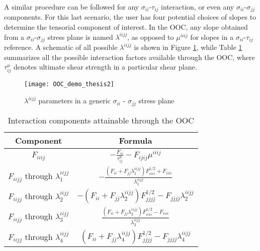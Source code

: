 \documentclass[main.tex]{subfiles}
\begin{document}
A similar procedure can be followed for any $\sigma_{ii}$-$\tau_{ij}$ interaction, or even any $\sigma_{ii}$-$\sigma_{jj}$ components. For this last scenario, the user has four potential choices of slopes to determine the tensorial component of interest. In the OOC, any slope obtained from a $\sigma_{ii}$-$\sigma_{jj}$ stress plane is named $\lambda^{iijj}$, as opposed to $\mu^{iiij}$ for slopes in a $\sigma_{ii}$-$\tau_{ij}$ reference. A schematic of all possible $\lambda^{iijj}$ is shown in Figure \ref{fig:OOCdemo2}, while Table \ref{tab:OOCcomp} summarizes all the possible interaction factors available through the OOC, where $\tau_{ij}^u$ denotes ultimate shear strength in a particular shear plane. 

\begin{figure}[h]
	\center
	\texttt{[image: OOC\_demo\_thesis2]}
	\caption{$\lambda^{iijj}$ parameters in a generic $\sigma_{ii}$ - $\sigma_{jj}$ stress plane} \label{fig:OOCdemo2}
\end{figure}

\begin{table} [h]
	\renewcommand{\arraystretch}{1.5}
	\centering
	\caption{Interaction components attainable through the OOC}
	\begin{tabular}{ c c } 
		\toprule
		\textbf{Component} & \textbf{Formula} \\
		\midrule
		$F_{iiij}$ & $-\frac{F_{ii}}{\tau_{ij}^u}-F_{ijij}\mu^{iiij}$\\
		$F_{iijj}$ through $\lambda^{iijj}_1$ & $-\frac{(F_{ii}+F_{jj}\lambda^{iijj}_1)F_{iiii}^{1/2}+F_{iiii}}{\lambda^{iijj}_1}$\\
		$F_{iijj}$ through $\lambda^{iijj}_2$ & $-(F_{ii}+F_{jj}\lambda^{iijj}_2)F_{jjjj}^{1/2}-F_{jjjj}\lambda^{iijj}_2$\\
		$F_{iijj}$ through $\lambda^{iijj}_3$ & $\frac{(F_{ii}+F_{jj}\lambda^{iijj}_3)F_{iiii}^{1/2}-F_{iiii}}{\lambda^{iijj}_3}$\\
		$F_{iijj}$ through $\lambda^{iijj}_4$ & $(F_{ii}+F_{jj}\lambda^{iijj}_4)F_{jjjj}^{1/2}-F_{jjjj}\lambda^{iijj}_4$\\
		\bottomrule
	\end{tabular}
	\label{tab:OOCcomp}
\end{table}
\pagebreak
% 
% 

\end{document}
